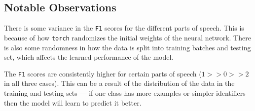 \subsection{Notable Observations}

\begin{enumarabic}
  \item There is some variance in the \verb|F1| scores for the different parts of speech.
    This is because of how \verb|torch| randomizes the initial weights of the neural network.
    There is also some randomness in how the data is split into training batches and testing set,
    which affects the learned performance of the model.
  \item The \verb|F1| scores are consistently higher for certain parts of speech
    ($1 >> 0 >> 2$ in all three cases).
    This can be a result of the distribution of the data in the training and testing sets
    --- if one class has more examples or simpler identifiers
    then the model will learn to predict it better.
\end{enumarabic}
